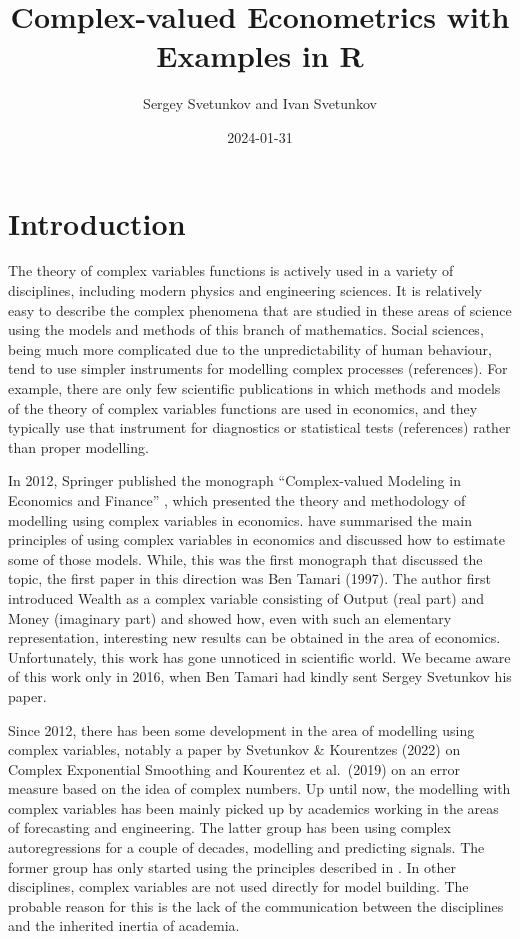 \documentclass[
]{book}
\title{Complex-valued Econometrics with Examples in R}
\author{Sergey Svetunkov and Ivan Svetunkov}
\date{2024-01-31}
\begin{document}
\maketitle

{
\setcounter{tocdepth}{2}
\tableofcontents
}
\hypertarget{introduction}{%
\chapter*{Introduction}\label{introduction}}

The theory of complex variables functions is actively used in a variety of disciplines, including modern physics and engineering sciences. It is relatively easy to describe the complex phenomena that are studied in these areas of science using the models and methods of this branch of mathematics. Social sciences, being much more complicated due to the unpredictability of human behaviour, tend to use simpler instruments for modelling complex processes (references). For example, there are only few scientific publications in which methods and models of the theory of complex variables functions are used in economics, and they typically use that instrument for diagnostics or statistical tests (references) rather than proper modelling.

In 2012, Springer published the monograph ``Complex-valued Modeling in Economics and Finance'' \citep{Svetunkov2012}, which presented the theory and methodology of modelling using complex variables in economics. \citet{Svetunkov2012} have summarised the main principles of using complex variables in economics and discussed how to estimate some of those models. While, this was the first monograph that discussed the topic, the first paper in this direction was Ben Tamari (1997). The author first introduced Wealth as a complex variable consisting of Output (real part) and Money (imaginary part) and showed how, even with such an elementary representation, interesting new results can be obtained in the area of economics. Unfortunately, this work has gone unnoticed in scientific world. We became aware of this work only in 2016, when Ben Tamari had kindly sent Sergey Svetunkov his paper.

Since 2012, there has been some development in the area of modelling using complex variables, notably a paper by Svetunkov \& Kourentzes (2022) on Complex Exponential Smoothing and Kourentez et al.~(2019) on an error measure based on the idea of complex numbers. Up until now, the modelling with complex variables has been mainly picked up by academics working in the areas of forecasting and engineering. The latter group has been using complex autoregressions for a couple of decades, modelling and predicting signals. The former group has only started using the principles described in \citet{Svetunkov2012}. In other disciplines, complex variables are not used directly for model building. The probable reason for this is the lack of the communication between the disciplines and the inherited inertia of academia.
\end{document}
